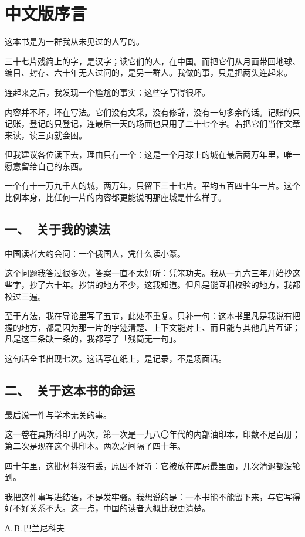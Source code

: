 \clearpage
\chapter*{中文版序言}

这本书是为一群我从未见过的人写的。

三十七片残简上的字，是汉字；读它们的人，在中国。而把它们从月面带回地球、编目、封存、六十年无人过问的，是另一群人。我做的事，只是把两头连起来。

连起来之后，我发现一个尴尬的事实：这些字写得很坏。

内容并不坏，坏在写法。它们没有文采，没有修辞，没有一句多余的话。记账的只记账，登记的只登记，连最后一天的场面也只用了二十七个字。若把它们当作文章来读，读三页就会困。

但我建议各位读下去，理由只有一个：这是一个月球上的城在最后两万年里，唯一愿意留给自己的东西。

一个有十一万九千人的城，两万年，只留下三十七片。平均五百四十年一片。这个比例本身，比任何一片的内容都更能说明那座城是什么样子。

\section*{一、\ 关于我的读法}

中国读者大约会问：一个俄国人，凭什么读小篆。

这个问题我答过很多次，答案一直不太好听：凭笨功夫。我从一九六三年开始抄这些字，抄了六十年。抄错的地方不少，这我知道。但凡是能互相校验的地方，我都校过三遍。

至于方法，我在导论里写了五节，此处不重复。只补一句：这本书里凡是我说有把握的地方，都是因为那一片的字迹清楚、上下文能对上、而且能与其他几片互证；凡是这三条缺一条的，我都写了「残简无一句」。

这句话全书出现七次。这话写在纸上，是记录，不是场面话。

\section*{二、\ 关于这本书的命运}

最后说一件与学术无关的事。

这一卷在莫斯科印了两次，第一次是一九八〇年代的内部油印本，印数不足百册；第二次是现在这个排印本。两次之间隔了四十年。

四十年里，这批材料没有丢，原因不好听：它被放在库房最里面，几次清退都没轮到。

我把这件事写进结语，不是发牢骚。我想说的是：一本书能不能留下来，与它写得好不好关系不大。这一点，中国的读者大概比我更清楚。

\begin{flushright}
{\small А.\,В.\,巴兰尼科夫}
\end{flushright}
